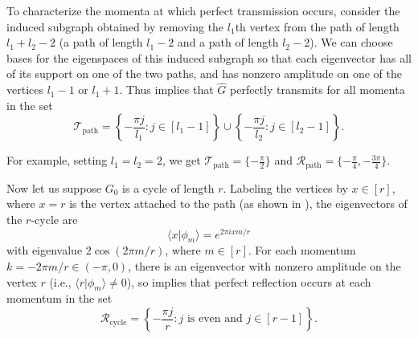 \documentclass[../thesis-main/thesis-main]{subfiles}
\begin{document}
To characterize the momenta at which perfect transmission occurs, consider the induced subgraph obtained by removing the $l_1$th vertex from the path of length $l_1+l_2-2$ (a path of length $l_1-2$ and a path of length $l_2-2$). We can choose bases for the eigenspaces of this induced subgraph so that each eigenvector has all of its support on one of the two paths, and has nonzero amplitude on one of the vertices $l_1-1$ or $l_1+1$. Thus  implies that $\hat{G}$ perfectly transmits for all momenta in the set
\[
  \mathcal{T}_{\mathrm{path}} = \left\{- \frac{\pi j}{l_1} \colon j\in [l_1-1]\right\} \cup \left\{-\frac{\pi j}{l_2 } \colon j \in [l_2-1]\right\}.
\]

For example, setting $l_1 = l_2 = 2$, we get $\mathcal{T}_{\mathrm{path}} = \{-\frac{\pi}{2}\}$ and $\mathcal{R}_{\mathrm{path}} = \{-\frac{\pi}{4}, -\frac{3\pi}{4}\}$.


Now let us suppose $G_0$ is a cycle of length $r$. Labeling the vertices by $x \in [r]$, where $x=r$ is the vertex attached to the path (as shown in ), the eigenvectors of the $r$-cycle are
\[
  \langle x | \phi_m\rangle = e^{{2 \pi i x m}/{r}}
\]
with eigenvalue $2 \cos(2 \pi m/r)$, where $m\in [r]$. For each momentum $k=-2 \pi m/r \in (-\pi,0)$, there is an eigenvector with nonzero amplitude on the vertex $r$ (i.e., $\langle r | \phi_m\rangle\neq 0$), so  implies that perfect reflection occurs at each momentum in the set
\[
  \mathcal{R}_{\mathrm{cycle}} = \left\{ -\frac{\pi j}{r} \colon \text{$j$ is even and $j\in [r-1]$}\right\}.
\]

%    
%    
%    
%    
%    
%    
%    
%  
\end{document}
